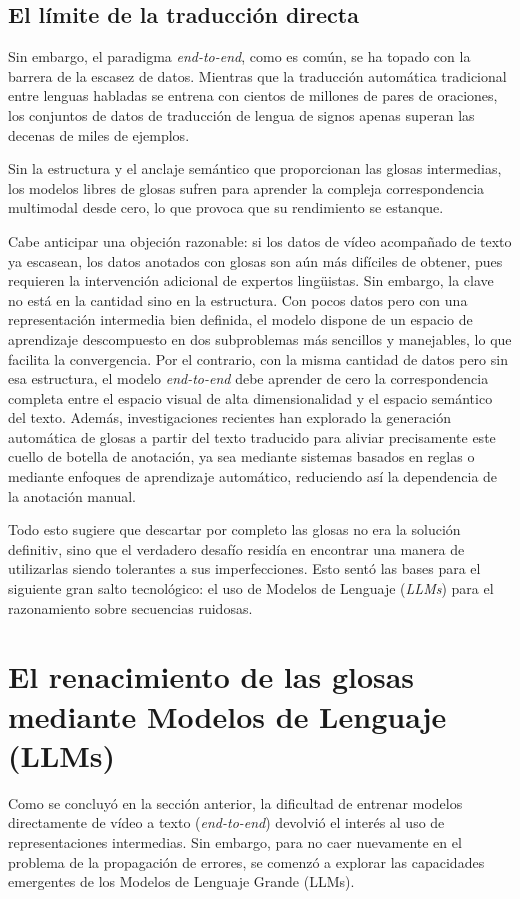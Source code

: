 \subsection{El límite de la traducción directa}
Sin embargo, el paradigma \textit{end-to-end}, como es común, se ha topado con la barrera de la escasez de datos.
Mientras que la traducción automática tradicional entre lenguas habladas se entrena con cientos de millones de pares de oraciones, los conjuntos de datos de traducción de lengua de signos apenas superan las decenas de miles de ejemplos.

Sin la estructura y el anclaje semántico que proporcionan las glosas intermedias, los modelos libres de glosas sufren para aprender la compleja correspondencia multimodal desde cero, lo que provoca que su rendimiento se estanque.

Cabe anticipar una objeción razonable: si los datos de vídeo acompañado de texto ya escasean, los datos anotados con glosas son aún más difíciles de obtener, pues requieren la intervención adicional de expertos lingüistas.
Sin embargo, la clave no está en la cantidad sino en la estructura.
Con pocos datos pero con una representación intermedia bien definida, el modelo dispone de un espacio de aprendizaje descompuesto en dos subproblemas más sencillos y manejables, lo que facilita la convergencia.
Por el contrario, con la misma cantidad de datos pero sin esa estructura, el modelo \textit{end-to-end} debe aprender de cero la correspondencia completa entre el espacio visual de alta dimensionalidad y el espacio semántico del texto.
Además, investigaciones recientes han explorado la generación automática de glosas a partir del texto traducido para aliviar precisamente este cuello de botella de anotación, ya sea mediante sistemas basados en reglas \cite{SyntheticCGeneration} o mediante enfoques de aprendizaje automático, reduciendo así la dependencia de la anotación manual.

Todo esto sugiere que descartar por completo las glosas no era la solución definitiv, sino que el verdadero desafío residía en encontrar una manera de utilizarlas siendo tolerantes a sus imperfecciones.
Esto sentó las bases para el siguiente gran salto tecnológico: el uso de Modelos de Lenguaje (\textit{LLMs}) para el razonamiento sobre secuencias ruidosas.


\section{El renacimiento de las glosas mediante Modelos de Lenguaje (LLMs)}
Como se concluyó en la sección anterior, la dificultad de entrenar modelos directamente de vídeo a texto (\textit{end-to-end}) devolvió el interés al uso de representaciones intermedias.
Sin embargo, para no caer nuevamente en el problema de la propagación de errores, se comenzó a explorar las capacidades emergentes de los Modelos de Lenguaje Grande (LLMs).

